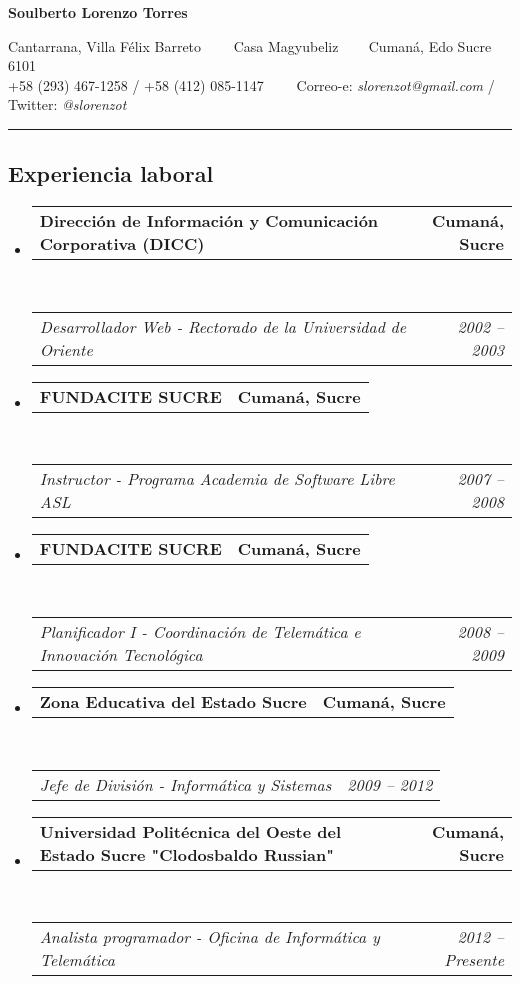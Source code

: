 \documentclass[10pt,letterpaper]{article}
\makeatletter
\newcommand{\headerrow}[2]
{\begin{tabular*}{\linewidth}{l@{\extracolsep{\fill}}r}
	#1 &
	#2 \\
\end{tabular*}}
\makeatother
\begin{document}
\begin{center}
{\LARGE \textbf{Soulberto Lorenzo Torres}}

Cantarrana, Villa Félix Barreto\ \ \textbullet
\ \ Casa Magyubeliz \ \textbullet
\ \ Cumaná, Edo Sucre 6101
\\
+58 (293) 467-1258 / +58 (412) 085-1147\ \ \textbullet
\ \ Correo-e: \textit{slorenzot@gmail.com} / Twitter: \textit{@slorenzot}
\end{center}

\hrule
\vspace{-0.4em}
\subsection*{Experiencia laboral}

\begin{itemize}
	\parskip=0.1em

	\item
	\headerrow
		{\textbf{Dirección de Información y Comunicación Corporativa (DICC)}}
		{\textbf{Cumaná, Sucre}}
	\\
	\headerrow
		{\emph{Desarrollador Web - Rectorado de la Universidad de Oriente}}
		{\emph{2002 -- 2003}}

	\item
	\headerrow
		{\textbf{FUNDACITE SUCRE}}
		{\textbf{Cumaná, Sucre}}
	\\
	\headerrow
		{\emph{Instructor - Programa Academia de Software Libre ASL}}
		{\emph{2007 -- 2008}}
	
	\item
	\headerrow
		{\textbf{FUNDACITE SUCRE}}
		{\textbf{Cumaná, Sucre}}
	\\
	\headerrow
		{\emph{Planificador I - Coordinación de Telemática e Innovación Tecnológica}}
		{\emph{2008 -- 2009}}

	\item
	\headerrow
		{\textbf{Zona Educativa del Estado Sucre}}
		{\textbf{Cumaná, Sucre}}
	\\
	\headerrow
		{\emph{Jefe de División - Informática y Sistemas}}
		{\emph{2009 -- 2012}}
	
	\item
	\headerrow
		{\textbf{Universidad Politécnica del Oeste del Estado Sucre "Clodosbaldo Russian"}}
		{\textbf{Cumaná, Sucre}}
	\\
	\headerrow
		{\emph{Analista programador - Oficina de Informática y Telemática}}
		{\emph{2012 -- Presente}}

\end{itemize}
\end{document}
